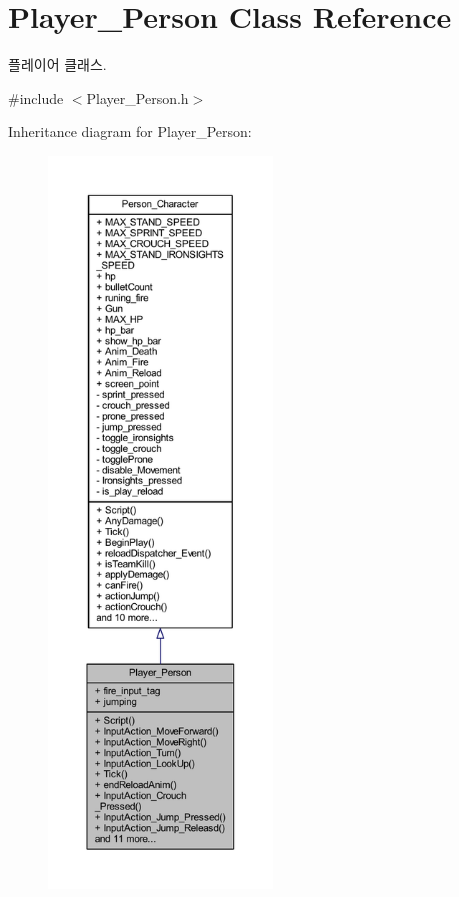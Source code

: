 \hypertarget{class_player___person}{}\section{Player\+\_\+\+Person Class Reference}
\label{class_player___person}


플레이어 클래스.  




{\ttfamily \#include $<$Player\+\_\+\+Person.\+h$>$}



Inheritance diagram for Player\+\_\+\+Person\+:
\nopagebreak
\begin{figure}[H]
\begin{center}
\leavevmode
\includegraphics[height=550pt]{class_player___person__inherit__graph}
\end{center}
\end{figure}


